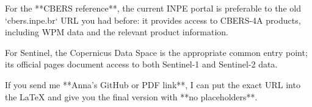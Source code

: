 \documentclass[11pt,a4paper]{article}
\begin{document}
For the **CBERS reference**, the current INPE portal is preferable to the old `cbers.inpe.br` URL you had before: it provides access to CBERS-4A products, including WPM data and the relevant product information.

For Sentinel, the Copernicus Data Space is the appropriate common entry point; its official pages document access to both Sentinel-1 and Sentinel-2 data.

If you send me **Anna's GitHub or PDF link**, I can put the exact URL into the LaTeX and give you the final version with **no placeholders**.
\end{document}
